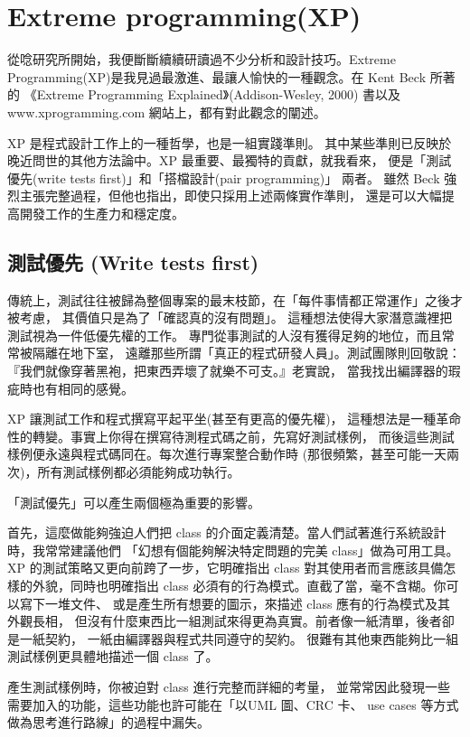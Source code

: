 \section{Extreme programming(XP)}
從唸研究所開始，我便斷斷續續研讀過不少分析和設計技巧。Extreme
Programming(XP)是我見過最激進、最讓人愉快的一種觀念。在 Kent Beck 所著的
《Extreme Programming Explained》(Addison-Wesley, 2000) 書以及
www.xprogramming.com 網站上，都有對此觀念的闡述。

XP 是程式設計工作上的一種哲學，也是一組實踐準則。
其中某些準則已反映於晚近問世的其他方法論中。XP 最重要、最獨特的貢獻，就我看來，
便是「測試優先(write tests first)」和「搭檔設計(pair programming)」 兩者。
雖然 Beck 強烈主張完整過程，但他也指出，即使只採用上述兩條實作準則，
還是可以大幅提高開發工作的生產力和穩定度。
\subsection{測試優先 (Write tests first)}
傳統上，測試往往被歸為整個專案的最末枝節，在「每件事情都正常運作」之後才被考慮，
其價值只是為了「確認真的沒有問題」。
這種想法使得大家潛意識裡把測試視為一件低優先權的工作。
專門從事測試的人沒有獲得足夠的地位，而且常常被隔離在地下室，
遠離那些所謂「真正的程式研發人員」。測試團隊則回敬說：
『我們就像穿著黑袍，把東西弄壞了就樂不可支。』老實說，
當我找出編譯器的瑕疵時也有相同的感覺。

XP 讓測試工作和程式撰寫平起平坐(甚至有更高的優先權)，
這種想法是一種革命性的轉變。事實上你得在撰寫待測程式碼之前，先寫好測試樣例，
而後這些測試樣例便永遠與程式碼同在。每次進行專案整合動作時
(那很頻繁，甚至可能一天兩次)，所有測試樣例都必須能夠成功執行。

「測試優先」可以產生兩個極為重要的影響。

首先，這麼做能夠強迫人們把
class 的介面定義清楚。當人們試著進行系統設計時，我常常建議他們
「幻想有個能夠解決特定問題的完美 class」做為可用工具。
XP 的測試策略又更向前跨了一步，它明確指出 class
對其使用者而言應該具備怎樣的外貌，同時也明確指出
class 必須有的行為模式。直截了當，毫不含糊。你可以寫下一堆文件、
或是產生所有想要的圖示，來描述 class 應有的行為模式及其外觀長相，
但沒有什麼東西比一組測試來得更為真實。前者像一紙清單，後者卻是一紙契約，
一紙由編譯器與程式共同遵守的契約。
很難有其他東西能夠比一組測試樣例更具體地描述一個 class 了。

產生測試樣例時，你被迫對 class 進行完整而詳細的考量，
並常常因此發現一些需要加入的功能，這些功能也許可能在「以UML 圖、CRC 卡、
use cases 等方式做為思考進行路線」的過程中漏失。

